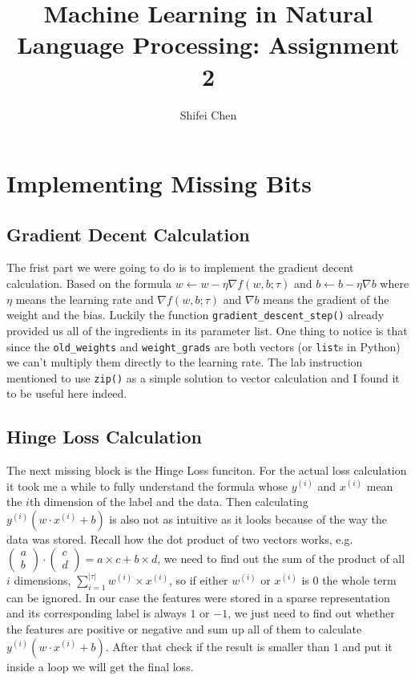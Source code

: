 \documentclass[11pt]{article} %
\title{{\LARGE Machine Learning in Natural Language Processing: \newline Assignment 2}\\[1.5mm]} %
\author{Shifei Chen} %
\begin{document}
\maketitle

\section{Implementing Missing Bits}

\subsection{Gradient Decent Calculation}
The frist part we were going to do is to implement the gradient decent calculation. Based on the formula $w \leftarrow w - \eta\nabla f(w,b;\tau)$ and $b \leftarrow b - \eta\nabla b$ where $\eta$ means the learning rate and $\nabla f(w,b;\tau)$ and $\nabla b$ means the gradient of the weight and the bias. Luckily the function \verb|gradient_descent_step()| already provided us all of the ingredients in its parameter list. One thing to notice is that since the \verb|old_weights| and \verb|weight_grads| are both vectors (or \verb|list|s in Python) we can't multiply them directly to the learning rate. The lab instruction mentioned to use \verb|zip()| as a simple solution to vector calculation and I found it to be useful here indeed.

\subsection{Hinge Loss Calculation}

The next missing block is the Hinge Loss funciton. For the actual loss calculation it took me a while to fully understand the formula whose $y^{(i)}$ and $x^{(i)}$ mean the $i$th dimension of the label and the data. Then calculating  $y^{(i)}(w\cdot x^{(i)} + b)$ is also not as intuitive as it looks because of the way the data was stored. Recall how the dot product of two vectors works, e.g. $\left(\begin{smallmatrix}a\\b\end{smallmatrix}\right) \cdot \left(\begin{smallmatrix}c\\d\end{smallmatrix}\right) = a\times c + b\times d$, we need to find out the sum of the product of all $i$ dimensions, $\sum_{i=1}^{|\tau|}{w^{(i)}\times x^{(i)}}$, so if either $w^{(i)}$ or $x^{(i)}$ is $0$ the whole term can be ignored. In our case the features were stored in a sparse representation and its corresponding label is always $1$ or $-1$, we just need to find out whether the features are positive or negative and sum up all of them to calculate $y^{(i)}(w\cdot x^{(i)} + b)$. After that check if the result is smaller than $1$ and put it inside a loop we will get the final loss. 
\end{document}
